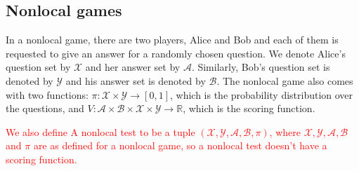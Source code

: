 \documentclass[11pt,letterpaper]{article}
\newcommand{\R}{\mathbb{R}}
\newcommand{\calX}{\mathcal{X}}
\newcommand{\calY}{\mathcal{Y}}
\newcommand{\calA}{\mathcal{A}}
\newcommand{\calB}{\mathcal{B}}
\newcommand{\1}{\mathbb{1}}
\newcommand{\hf}[1]{\textcolor{red}{#1}}
\theoremstyle{definition}
\begin{document}
\subsection{Nonlocal games}
In a nonlocal game, there are two players, Alice and Bob and each of them is requested
to give an answer for a randomly chosen question. We denote Alice's question set by $\calX$ and her answer set by $\calA$. Similarly,
Bob's question set is denoted by $\calY$ and his answer set is denoted by $\calB$. The nonlocal game also
comes with two functions: $\pi: \calX \times \calY \rightarrow [0,1]$, which is the probability distribution over the questions,
and $V: \calA \times \calB \times \calX \times \calY \rightarrow \R$, which is the scoring function. 


\hf{We also define A nonlocal test 
to be a tuple $(\calX, \calY, \calA, \calB, \pi)$, where
$\calX, \calY, \calA, \calB$ and $\pi$ are as defined for a nonlocal game, so a nonlocal test doesn't have a scoring function.}
\end{document}
